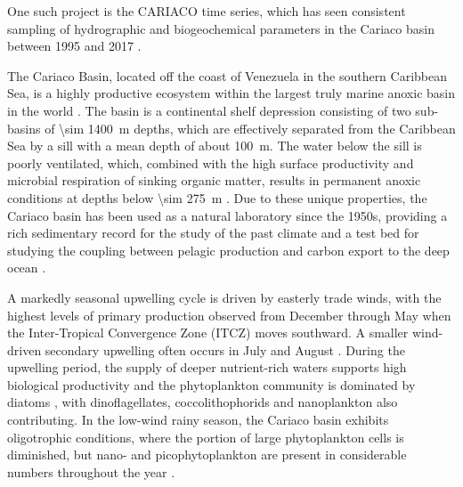 \documentclass[draft]{agujournal2019}
\begin{document}
    One such project is the CARIACO time series, which has seen consistent sampling of hydrographic and biogeochemical parameters in the Cariaco basin between 1995 and 2017 \cite{muller-karger_scientific_2019}. 

    The Cariaco Basin, located off the coast of Venezuela in the southern Caribbean Sea, is a highly productive ecosystem within the largest truly marine anoxic basin in the world \cite{edgcomb_accessing_2011}. The basin is a continental shelf depression consisting of two sub-basins of \qty{\sim 1400}{m} depths, which are effectively separated from the Caribbean Sea by a sill with a mean depth of about \qty{100}{m}. The water below the sill is poorly ventilated, which, combined with the high surface productivity and microbial respiration of sinking organic matter, results in permanent anoxic conditions at depths below \qty{\sim 275}{m} \cite{thunell_organic_2000}. Due to these unique properties, the Cariaco basin has been used as a natural laboratory since the 1950s, providing a rich sedimentary record for the study of the past climate \cite{hughen1996nature} and a test bed for studying the coupling between pelagic production and carbon export to the deep ocean \cite{montes_vertical_2012}.

    A markedly seasonal upwelling cycle is driven by easterly trade winds, with the highest levels of primary production observed from December through May when the Inter-Tropical Convergence Zone (ITCZ) moves southward. A smaller wind-driven secondary upwelling often occurs in July and August \cite{mullerkarger_annual_2001, astor_seasonal_2003}. During the upwelling period, the supply of deeper nutrient-rich waters supports high biological productivity and the phytoplankton community is dominated by diatoms \cite{romero_seasonal_2009}, with dinoflagellates, coccolithophorids and nanoplankton also contributing. In the low-wind rainy season, the Cariaco basin exhibits oligotrophic conditions, where the portion of large phytoplankton cells is diminished, but nano- and picophytoplankton are present in considerable numbers throughout the year \cite{lorenzoni_characterization_2015}.    
\end{document}
